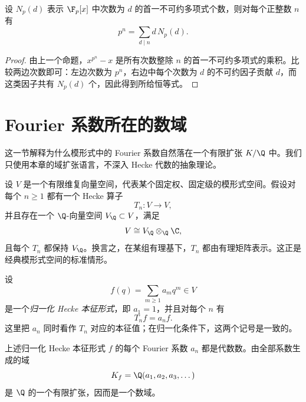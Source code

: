 \begin{corollary}
设 $N_p(d)$ 表示 $\F_p[x]$ 中次数为 $d$ 的首一不可约多项式个数，则对每个正整数 $n$ 有
\[
p^n=\sum_{d\mid n} d\,N_p(d).
\]
\end{corollary}

\begin{proof}
由上一个命题，$x^{p^n}-x$ 是所有次数整除 $n$ 的首一不可约多项式的乘积。比较两边次数即可：左边次数为 $p^n$，右边中每个次数为 $d$ 的不可约因子贡献 $d$，而这类因子共有 $N_p(d)$ 个，因此得到所给恒等式。
\end{proof}

\section{Fourier 系数所在的数域}

这一节解释为什么模形式中的 Fourier 系数自然落在一个有限扩张 $K/\Q$ 中。我们只使用本章的域扩张语言，不深入 Hecke 代数的抽象理论。

设 $V$ 是一个有限维复向量空间，代表某个固定权、固定级的模形式空间。假设对每个 $n\ge1$ 都有一个 Hecke 算子
\[
T_n:V\to V,
\]
并且存在一个 $\Q$-向量空间 $V_{\Q}\subset V$，满足
\[
V\cong V_{\Q}\otimes_{\Q}\C,
\]
且每个 $T_n$ 都保持 $V_{\Q}$。换言之，在某组有理基下，$T_n$ 都由有理矩阵表示。这正是经典模形式空间的标准情形。

设
\[
f(q)=\sum_{m\ge1} a_m q^m\in V
\]
是一个\emph{归一化 Hecke 本征形式}，即 $a_1=1$，并且对每个 $n$ 有
\[
T_n f=a_n f.
\]
这里把 $a_n$ 同时看作 $T_n$ 对应的本征值；在归一化条件下，这两个记号是一致的。

\begin{theorem}
上述归一化 Hecke 本征形式 $f$ 的每个 Fourier 系数 $a_n$ 都是代数数。由全部系数生成的域
\[
K_f=\Q(a_1,a_2,a_3,\dots)
\]
是 $\Q$ 的一个有限扩张，因而是一个数域。
\end{theorem}

